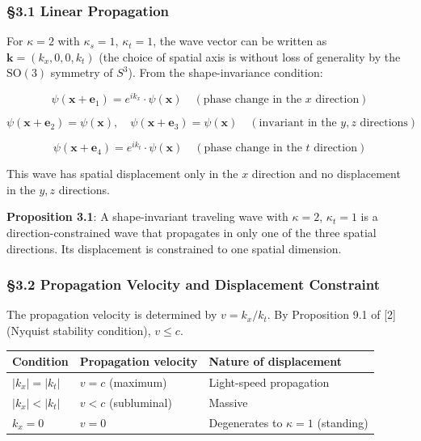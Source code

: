 \documentclass[
  a4paper,11pt]{article}
\newcounter{none}
\theoremstyle{definition}
\theoremstyle{remark}
\begin{document}
\subsubsection{§3.1 Linear Propagation}\label{linear-propagation}

For \(\kappa = 2\) with \(\kappa_s = 1\), \(\kappa_t = 1\), the wave
vector can be written as \(\mathbf{k} = (k_x, 0, 0, k_t)\) (the choice
of spatial axis is without loss of generality by the \(\mathrm{SO}(3)\)
symmetry of \(S^3\)). From the shape-invariance condition:

\[\psi(\mathbf{x} + \mathbf{e}_1) = e^{ik_x} \cdot \psi(\mathbf{x}) \quad (\text{phase change in the $x$ direction})\]

\[\psi(\mathbf{x} + \mathbf{e}_2) = \psi(\mathbf{x}), \quad \psi(\mathbf{x} + \mathbf{e}_3) = \psi(\mathbf{x}) \quad (\text{invariant in the $y, z$ directions})\]

\[\psi(\mathbf{x} + \mathbf{e}_4) = e^{ik_t} \cdot \psi(\mathbf{x}) \quad (\text{phase change in the $t$ direction})\]

This wave has spatial displacement only in the \(x\) direction and no
displacement in the \(y, z\) directions.

\textbf{Proposition 3.1}: A shape-invariant traveling wave with
\(\kappa = 2\), \(\kappa_t = 1\) is a direction-constrained wave that
propagates in only one of the three spatial directions. Its displacement
is constrained to one spatial dimension.

\subsubsection{§3.2 Propagation Velocity and Displacement
Constraint}\label{propagation-velocity-and-displacement-constraint}

The propagation velocity is determined by \(v = k_x / k_t\). By
Proposition 9.1 of {[}2{]} (Nyquist stability condition), \(v \leq c\).

{\def\LTcaptype{none} %
\begin{longtable}[]{@{}lll@{}}
\toprule\noalign{}
Condition & Propagation velocity & Nature of displacement \\
\midrule\noalign{}
\endhead
\bottomrule\noalign{}
\endlastfoot
\(|k_x| = |k_t|\) & \(v = c\) (maximum) & Light-speed propagation \\
\(|k_x| < |k_t|\) & \(v < c\) (subluminal) & Massive \\
\(k_x = 0\) & \(v = 0\) & Degenerates to \(\kappa = 1\) (standing) \\
\end{longtable}
}
\end{document}
